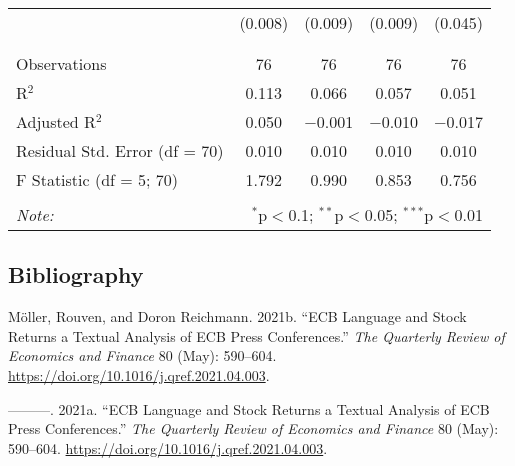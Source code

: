 \documentclass[
]{article}
\newlength{\cslhangindent}
\newlength{\cslentryspacingunit} %
\newenvironment{CSLReferences}[2] %
 {%
  \setlength{\parindent}{0pt}
  \ifodd #1
  \let\oldpar\par
  \def\par{\hangindent=\cslhangindent\oldpar}
  \fi
  \setlength{\parskip}{#2\cslentryspacingunit}
 }%
 {}
\begin{document}
\begin{table}[!htbp]
\begin{tabular}{@{\extracolsep{5pt}}lcccc}
  & (0.008) & (0.009) & (0.009) & (0.045) \\ 
  & & & & \\ 
\hline \\[-1.8ex] 
Observations & 76 & 76 & 76 & 76 \\ 
R$^{2}$ & 0.113 & 0.066 & 0.057 & 0.051 \\ 
Adjusted R$^{2}$ & 0.050 & $-$0.001 & $-$0.010 & $-$0.017 \\ 
Residual Std. Error (df = 70) & 0.010 & 0.010 & 0.010 & 0.010 \\ 
F Statistic (df = 5; 70) & 1.792 & 0.990 & 0.853 & 0.756 \\ 
\hline 
\hline \\[-1.8ex] 
\textit{Note:}  & \multicolumn{4}{r}{$^{*}$p$<$0.1; $^{**}$p$<$0.05; $^{***}$p$<$0.01} \\ 
\end{tabular} 
\end{table}

\hypertarget{sec-bibliography}{%
\subsection*{Bibliography}\label{sec-bibliography}}

\hypertarget{refs}{}
\begin{CSLReferences}{1}{0}
\leavevmode{}%
Möller, Rouven, and Doron Reichmann. 2021b. {``ECB Language and Stock
Returns {\textendash} a Textual Analysis of ECB Press Conferences.''}
\emph{The Quarterly Review of Economics and Finance} 80 (May): 590--604.
\url{https://doi.org/10.1016/j.qref.2021.04.003}.

\leavevmode{}%
---------. 2021a. {``ECB Language and Stock Returns {\textendash} a
Textual Analysis of ECB Press Conferences.''} \emph{The Quarterly Review
of Economics and Finance} 80 (May): 590--604.
\url{https://doi.org/10.1016/j.qref.2021.04.003}.

\end{CSLReferences}
\end{document}
